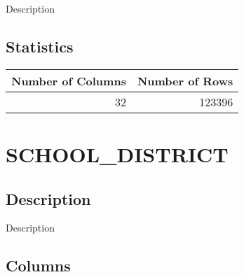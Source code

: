 \documentclass[
  letterpaper,
  DIV=11,
  numbers=noendperiod]{scrreprt}
\begin{document}
Description

\hypertarget{statistics-34}{%
\section*{Statistics}\label{statistics-34}}

\begin{longtable}{rr}
\toprule
Number of Columns & Number of Rows \\ 
\midrule
32 & 123396 \\ 
\bottomrule
\end{longtable}

\hypertarget{school_district}{%
\chapter*{SCHOOL\_DISTRICT}\label{school_district}}

\hypertarget{description-35}{%
\section*{Description}\label{description-35}}

Description

\hypertarget{columns-35}{%
\section*{Columns}\label{columns-35}}
\end{document}
